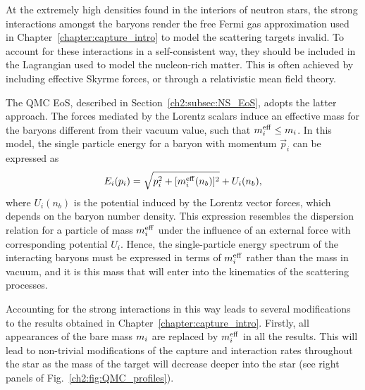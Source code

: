 At the extremely high densities found in the interiors of neutron stars, the strong interactions amongst the baryons render the free Fermi gas approximation used in Chapter~\ref{chapter:capture_intro} to model the scattering targets invalid. To account for these interactions in a self-consistent way, they should be included in the Lagrangian used to model the nucleon-rich matter. This is often achieved by including effective Skyrme forces, or through a relativistic mean field theory.

The QMC EoS, described in Section~\ref{ch2:subsec:NS_EoS}, adopts the latter approach. The forces mediated by the Lorentz scalars induce an effective mass for the baryons different from their vacuum value, such that $m_i^{\rm eff} \leq m_i$. In this model, the single particle energy for a baryon with momentum $\vec{p}_i$ can be expressed as
\begin{equation}
   E_i(p_i) = \sqrt{p_i^2 + [m_i^{\rm eff}(n_b)]^2} + U_i(n_b),
   \label{ch5:eq:total_energy}
\end{equation}
where $U_i(n_b)$ is the potential induced by the Lorentz vector forces, which depends on the baryon number density. This expression resembles the dispersion relation for a particle of mass $m_i^{\rm eff}$ under the influence of an external force with corresponding potential $U_i$. Hence, the single-particle energy spectrum of the interacting baryons must be expressed in terms of $m_i^{\rm eff}$ rather than the mass in vacuum, and it is this mass that will enter into the kinematics of the scattering processes.  

Accounting for the strong interactions in this way leads to several modifications to the results obtained in Chapter~\ref{chapter:capture_intro}. Firstly, all appearances of the bare mass $m_i$ are replaced by $m_i^{\rm eff}$ in all the results. This will lead to non-trivial modifications of the capture and interaction rates throughout the star as the mass of the target will decrease deeper into the star (see right panels of Fig.~\ref{ch2:fig:QMC_profiles}).

